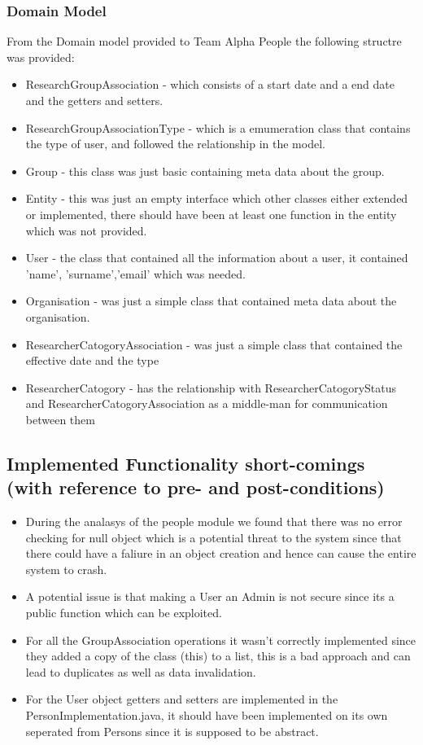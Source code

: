 \documentclass{article}
\begin{document}
	\subsubsection{Domain Model}
	From the Domain model provided to Team Alpha People the following structre was provided:
	\begin{itemize}
	 \item ResearchGroupAssociation - which consists of a start date and a end date and the getters and setters.
	 \item ResearchGroupAssociationType - which is a emumeration class that contains the type of user, and followed the relationship in the model.
	 \item Group - this class was just basic containing meta data about the group.
	 \item Entity - this was just an empty interface which other classes either extended or implemented, there should have been at least one function in the entity which was not provided.
	 \item User - the class that contained all the information about a user, it contained 'name', 'surname','email' which was needed.
	 \item Organisation - was just a simple class that contained meta data about the organisation.
	 \item ResearcherCatogoryAssociation - was just a simple class that contained the effective date and the type
	 \item ResearcherCatogory - has the relationship with ResearcherCatogoryStatus and ResearcherCatogoryAssociation as a middle-man for communication between them
	 
	 
	 

	\end{itemize}

	

    \subsection{Implemented Functionality short-comings (with reference to pre- and post-conditions)}
	\begin{itemize}
	
	    \item During the analasys of the people module we found that there was no error checking for null object which is a potential threat to the system since that there could have a faliure in an object creation and hence can cause the entire system to crash.
	    \item A potential issue is that making a User an Admin is not secure since its a public function which can be exploited.
	    \item For all the GroupAssociation operations it wasn't correctly implemented since they added a copy of the class (this) to a list, this is a bad approach and can lead to duplicates as well as data invalidation.
	    \item For the User object getters and setters are implemented in the PersonImplementation.java, it should have been implemented on its own seperated from Persons since it is supposed to be abstract. 

	\end{itemize}
\end{document}
